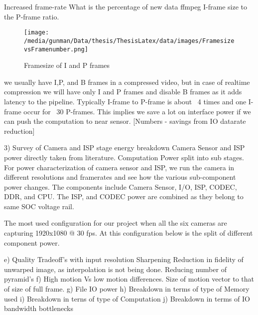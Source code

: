 	
Increased frame-rate\newline
What is the percentage of new data
ffmpeg I-frame size to the P-frame ratio.
\begin{figure*}
	\begin{center}
		\texttt{[image: /media/gunman/Data/thesis/ThesisLatex/data/images/FramesizevsFramenumber.png]}
		\caption{Framesize of I and P frames}
		\label{fig:ex_4_9}
	\end{center}
	\vspace{-0.3in}
\end{figure*} 
we usually have I,P, and B frames in a compressed video, but in case of realtime compression we will have only I and P frames and disable B frames as it adds latency to the pipeline. Typically I-frame to P-frame is about ~4 times and one I-frame occur for ~30 P-frames. This implies we save a lot on interface power if we can push the computation to near sensor.  
[Numbers - savings from IO datarate reduction]

3) Survey of Camera and ISP stage energy breakdown
Camera Sensor and ISP power directly taken from literature.
Computation Power split into sub stages. \newline
For power characterization of camera sensor and ISP, we run the camera in different resolutions and framerates and see how the various sub-component power changes. The components include Camera Sensor, I/O, ISP, CODEC, DDR, and CPU. The ISP, and CODEC power are combined as they belong to same SOC voltage rail.

The most used configuration for our project when all the six cameras are capturing 1920x1080 @ 30 fps. At this configuration below is the split of different component power. \newline


	e) Quality Tradeoff's with input resolution\newline
Sharpening
Reduction in fidelity of unwarped image, as interpolation is not being done.
Reducing number of pyramid's
f) High motion Vs low motion differences. Size of motion vector to that of size of full frame. 
g) File IO power
h) Breakdown in terms of type of Memory	used
i) Breakdown in terns of type of Computation
j) Breakdown in terms of IO bandwidth bottlenecks